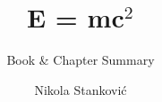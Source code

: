 \documentclass[a4paper,12pt]{scrreprt}
\newcommand{\autoren}{Nikola Stanković}
\newcommand{\dokumenttitel}{E = mc$^2$}
\newcommand{\dokumentuntertitel}{Book \& Chapter Summary}
\begin{document}
\author{\autoren}

\title{\dokumenttitel}
\subtitle{\dokumentuntertitel}
\maketitle
\tableofcontents


\end{document}
